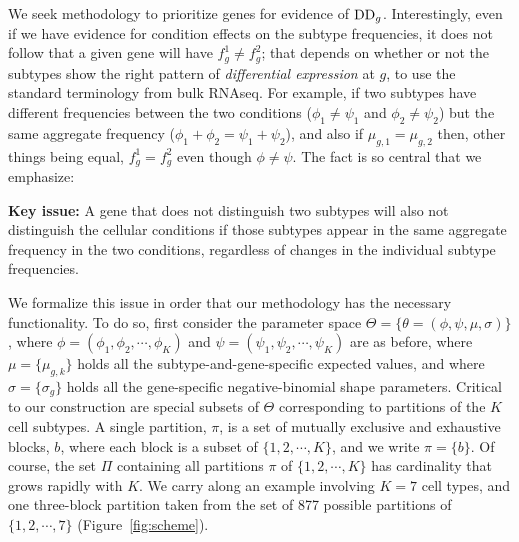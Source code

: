\documentclass[aoas,preprint]{imsart}
\begin{document}
We seek methodology to prioritize genes for evidence
of ${\rm DD}_g$.  Interestingly, even if we have evidence for condition effects
on the subtype frequencies, it does not follow that a given
gene will have $f^1_g \neq f^2_g$; that depends on whether or not the subtypes
show the right pattern of {\em differential expression} at $g$, to use the 
standard terminology from bulk RNAseq.  For example, if two subtypes have 
different frequencies between the two conditions ($\phi_1 \neq \psi_1$ and 
 $\phi_2 \neq \psi_2$) but the same aggregate frequency
($\phi_1+\phi_2 = \psi_1 + \psi_2$),  and also  if $\mu_{g,1} = \mu_{g,2}$
then, other things being equal, $f^1_g = f^2_g$ even though $\phi \neq \psi$. The fact
is so central that we emphasize:


\noindent
{\bf Key issue:} A gene that does not distinguish two subtypes will also not distinguish
the cellular conditions if those subtypes appear in the same aggregate frequency
in the two conditions, regardless of changes in the individual subtype 
frequencies. 

 We formalize this issue in order that our methodology
has the necessary functionality.  To do so,  first consider the parameter space 
$\Theta = \{ \theta=(\phi, \psi,\mu, \sigma)  \}$,
where $\phi=(\phi_1, \phi_2, \cdots, \phi_K)$ and $\psi=(\psi_1, \psi_2, \cdots, \psi_K)$ 
are as before, where $\mu = \{ \mu_{g,k} \}$ holds  all the subtype-and-gene-specific expected
values, and where $\sigma = \{ \sigma_g \}$ holds all the gene-specific negative-binomial
shape parameters.  Critical to our construction are special subsets of $\Theta$ corresponding
to partitions of the $K$ cell subtypes.  A single partition, $\pi$, is a set of
mutually exclusive and exhaustive blocks, $b$, where each block is a subset of $\{1, 2, 
\cdots, K\}$, and we write $\pi = \{ b \}$.  Of course,
the set $\Pi$ containing all partitions $\pi$ of $\{1,2, \cdots, K\}$
 has cardinality that grows rapidly with $K$. 
 We carry along an example
involving $K=7$ cell types, and one three-block partition taken
from the set of 877 possible partitions of $\{1, 2, \cdots, 7\}$ (Figure~\ref{fig:scheme}).
\end{document}
